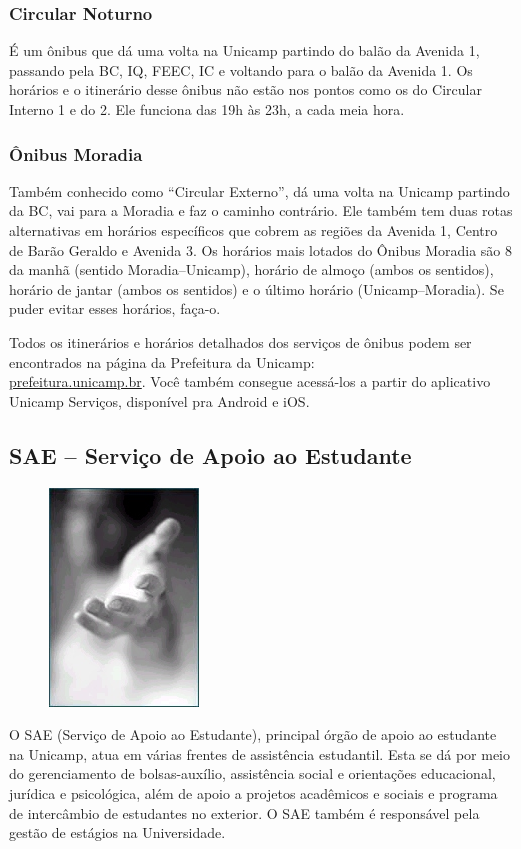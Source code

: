 \subsubsection{Circular Noturno}
É um ônibus que dá uma volta na Unicamp partindo do balão da Avenida 1, passando
pela BC, IQ, FEEC, IC e voltando para o balão da Avenida 1.  Os horários e o
itinerário desse ônibus não estão nos pontos como os do Circular Interno 1 e do
2. Ele funciona das 19h às 23h, a cada meia hora.

\subsubsection{Ônibus Moradia}
Também conhecido como ``Circular Externo'', dá uma volta na Unicamp partindo da
BC, vai para a Moradia e faz o caminho contrário. Ele também tem duas rotas
alternativas em horários específicos que cobrem as regiões da Avenida 1, Centro
de Barão Geraldo e Avenida 3. Os horários mais lotados do Ônibus Moradia são 8
da manhã (sentido Moradia--Unicamp), horário de almoço (ambos os sentidos),
horário de jantar (ambos os sentidos) e o último horário (Unicamp--Moradia). Se
puder evitar esses horários, faça-o.

Todos os itinerários e horários detalhados dos serviços de ônibus podem ser
encontrados na página da Prefeitura da Unicamp: \\\url{prefeitura.unicamp.br}.
Você também consegue acessá-los a partir do aplicativo Unicamp Serviços,
disponível pra Android e iOS.

\subsection{SAE -- Serviço de Apoio ao Estudante}
\begin{figure}
    \centering
    \includegraphics[width=.2\textwidth]{img/alem_da_graduacao/sae.jpg}
\end{figure}
O SAE (Serviço de Apoio ao Estudante), principal órgão de apoio ao estudante na
Unicamp, atua em várias frentes de assistência estudantil. Esta se dá por meio do
gerenciamento de bolsas-auxílio, assistência social e orientações educacional,
jurídica e psicológica, além de apoio a projetos acadêmicos e sociais e programa
de intercâmbio de estudantes no exterior. O SAE também é responsável pela gestão
de estágios na Universidade.

